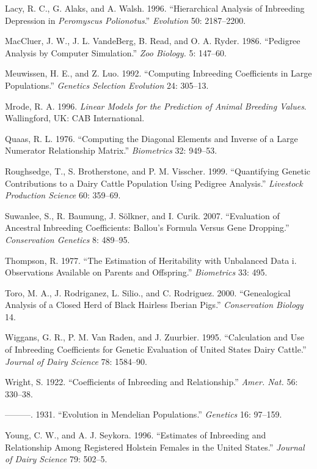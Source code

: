 \documentclass[
  letterpaper,
  DIV=11,
  numbers=noendperiod]{scrreprt}
\newlength{\cslhangindent}
\newenvironment{CSLReferences}[2] %
 {\begin{list}{}{%
  \setlength{\itemindent}{0pt}
  \setlength{\leftmargin}{0pt}
  \setlength{\parsep}{0pt}
  \ifodd #1
   \setlength{\leftmargin}{\cslhangindent}
   \setlength{\itemindent}{-1\cslhangindent}
  \fi
  \setlength{\itemsep}{#2\baselineskip}}}
 {\end{list}}
\begin{document}
\begin{CSLReferences}{1}{0}
Lacy, R. C., G. Alaks, and A. Walsh. 1996. {``Hierarchical Analysis of
Inbreeding Depression in \emph{{P}eromyscus Polionotus}.''}
\emph{Evolution} 50: 2187--2200.

MacCluer, J. W., J. L. VandeBerg, B. Read, and O. A. Ryder. 1986.
{``Pedigree Analysis by Computer Simulation.''} \emph{Zoo Biology.} 5:
147--60.

Meuwissen, H. E., and Z. Luo. 1992. {``Computing Inbreeding Coefficients
in Large Populations.''} \emph{Genetics Selection Evolution} 24:
305--13.

Mrode, R. A. 1996. \emph{Linear Models for the Prediction of Animal
Breeding Values}. Wallingford, UK: CAB International.

Quaas, R. L. 1976. {``Computing the Diagonal Elements and Inverse of a
Large Numerator Relationship Matrix.''} \emph{Biometrics} 32: 949--53.

Roughsedge, T., S. Brotherstone, and P. M. Visscher. 1999.
{``Quantifying Genetic Contributions to a Dairy Cattle Population Using
Pedigree Analysis.''} \emph{Livestock Production Science} 60: 359--69.

Suwanlee, S., R. Baumung, J. Sölkner, and I. Curik. 2007. {``Evaluation
of Ancestral Inbreeding Coefficients: Ballou's Formula Versus Gene
Dropping.''} \emph{Conservation Genetics} 8: 489--95.

Thompson, R. 1977. {``The Estimation of Heritability with Unbalanced
Data i. Observations Available on Parents and Offspring.''}
\emph{Biometrics} 33: 495.

Toro, M. A., J. Rodriganez, L. Silio., and C. Rodriguez. 2000.
{``Genealogical Analysis of a Closed Herd of Black Hairless {I}berian
Pigs.''} \emph{Conservation Biology} 14.

Wiggans, G. R., P. M. Van Raden, and J. Zuurbier. 1995. {``Calculation
and Use of Inbreeding Coefficients for Genetic Evaluation of {U}nited
{S}tates Dairy Cattle.''} \emph{Journal of Dairy Science} 78: 1584--90.

Wright, S. 1922. {``Coefficients of Inbreeding and Relationship.''}
\emph{Amer. Nat.} 56: 330--38.

---------. 1931. {``Evolution in {M}endelian Populations.''}
\emph{Genetics} 16: 97--159.

Young, C. W., and A. J. Seykora. 1996. {``Estimates of Inbreeding and
Relationship Among Registered {H}olstein Females in the {U}nited
{S}tates.''} \emph{Journal of Dairy Science} 79: 502--5.

\end{CSLReferences}



\printindex
\end{document}
